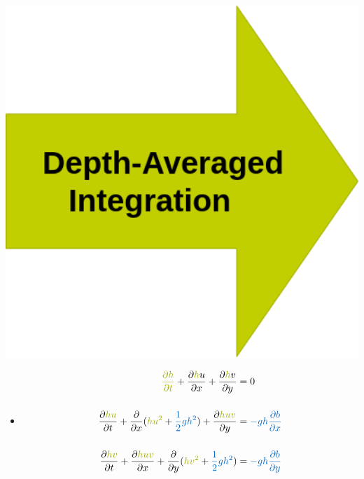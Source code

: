 \begin{frame}
\begin{minipage}{0.15\textwidth}
\begin{itemize}
\includegraphics[width=1\textwidth]{Resources/Images/arrow3.png}\\
\end{itemize}           
\end{minipage}
\hspace{1cm}
\begin{minipage}{0.4\textwidth}
\begin{itemize}
\item<3->[]
\begin{tcolorbox}[title=SWE model, colback=white] 
\begin{align*}
\myTUMgreen{\frac{\partial h}{\partial t}} + \frac{\partial \myTUMgreen{h}u}{\partial x} + \frac{\partial \myTUMgreen{h}v}{\partial y} &= 0\\[0.5cm]
\frac{\partial \myTUMgreen{hu}}{\partial t} + \frac{\partial}{\partial x}(\myTUMgreen{hu^2} + \myTUMdarkblue{\frac{1}{2} g h^2}) + \frac{\partial \myTUMgreen{huv}}{\partial y} &= \myTUMdarkblue{- gh\frac{\partial b}{\partial x}} \\[0.5cm]
\frac{\partial \myTUMgreen{hv}}{\partial t} + \frac{\partial \myTUMgreen{huv}}{\partial x} + \frac{\partial}{\partial y}(\myTUMgreen{hv^2} + \myTUMdarkblue{\frac{1}{2} g h^2})&= \myTUMdarkblue{- gh\frac{\partial b}{\partial y} }
\end{align*}
\end{tcolorbox}
\end{itemize}
\end{minipage}
\end{frame}
\clearpage


